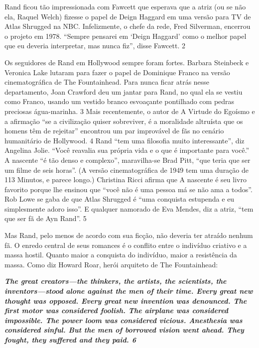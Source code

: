  
\par
 
Rand ficou tão impressionada com Fawcett que esperava que a atriz (ou se não ela, Raquel Welch) fizesse o papel de Deign Haggard em uma versão para TV de Atlas Shrugged na NBC. Infelizmente, o chefe da rede, Fred Silverman, encerrou o projeto em 1978. “Sempre pensarei em ‘Deign Haggard’ como o melhor papel que eu deveria interpretar, mas nunca fiz”, disse Fawcett.
 {\color{blue} 2}  

 
\par
 
Os seguidores de Rand em Hollywood sempre foram fortes. Barbara Steinbeck e Veronica Lake lutaram para fazer o papel de Dominique Franco na versão cinematográfica de The Fountainhead. Para nunca ficar atrás nesse departamento, Joan Crawford deu um jantar para Rand, no qual ela se vestiu como Franco, usando um vestido branco esvoaçante pontilhado com pedras preciosas água-marinha.
 {\color{blue} 3}  
Mais recentemente, o autor de A Virtude do Egoísmo e a afirmação “se a civilização quiser sobreviver, é a moralidade altruísta que os homens têm de rejeitar” encontrou um par improvável de fãs no cenário humanitário de Hollywood.
 {\color{blue} 4}  
Rand “tem uma filosofia muito interessante”, diz Angelina Jolie. “Você reavalia sua própria vida e o que é importante para você.” A nascente “é tão denso e complexo”, maravilha-se Brad Pitt, “que teria que ser um filme de seis horas”. (A versão cinematográfica de 1949 tem uma duração de
 {\color{blue} 113}  
Minutos, e parece longo.) Christina Ricci afirma que A nascente é seu livro favorito porque lhe ensinou que “você não é uma pessoa má se não ama a todos”. Rob Lowe se gaba de que Atlas Shrugged é “uma conquista estupenda e eu simplesmente adoro isso”. E qualquer namorado de Eva Mendes, diz a atriz, “tem que ser fã de Ayn Rand”.
 {\color{blue} 5}  

 
\par
 
Mas Rand, pelo menos de acordo com sua ficção, não deveria ter atraído nenhum fã. O enredo central de seus romances é o conflito entre o indivíduo criativo e a massa hostil. Quanto maior a conquista do indivíduo, maior a resistência da massa. Como diz Howard Roar, herói arquiteto de The Fountainhead:
 
\par
 

 \textbf{\textit{The great creators—the thinkers, the artists, the scientists, the inventors—stood alone against the men of their time. Every great new thought was opposed. Every great new invention was denounced. The first motor was considered foolish. The airplane was considered impossible. The power loom was considered vicious. Anesthesia was considered sinful. But the men of borrowed vision went ahead. They fought, they suffered and they paid. {{\color{blue} 6} } } }  
 
